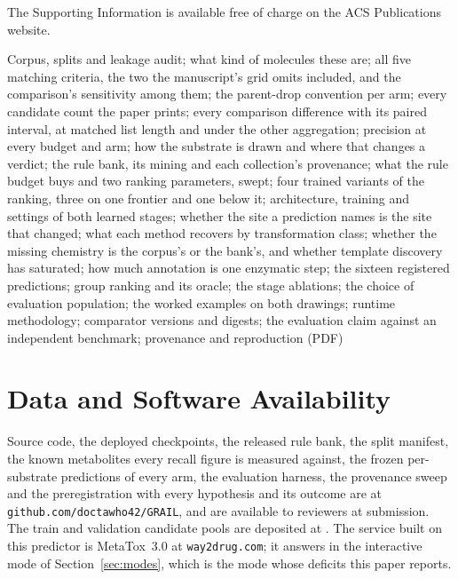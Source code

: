 \begin{suppinfo}

The Supporting Information is available free of charge on the ACS Publications website.

Corpus, splits and leakage audit; what kind of molecules these are; all five matching criteria,
the two the manuscript's grid omits included, and the comparison's sensitivity among them; the parent-drop convention per arm; every candidate count the paper prints; every comparison
difference with its paired interval, at matched list length and under the other aggregation;
precision at every budget and arm; how the substrate is drawn and where that changes a verdict; the rule bank, its
mining and each collection's provenance; what the rule budget buys and two ranking parameters,
swept; four trained variants of the ranking, three on one
frontier and one below it; architecture, training and settings of both learned
stages; whether the site a prediction names is the site that changed; what each method recovers by
transformation class; whether the missing chemistry is the corpus's or the bank's, and whether
template discovery has saturated; how much annotation is one enzymatic step; the sixteen
registered predictions; group ranking and its oracle; the stage ablations; the choice of evaluation
population; the worked examples on both drawings; runtime methodology; comparator versions and
digests; the evaluation claim against an independent benchmark; provenance and reproduction (PDF)

\end{suppinfo}

\section{Data and Software Availability}

Source code, the deployed checkpoints, the released rule bank, the split manifest, the known
metabolites every recall figure is measured against, the frozen per-substrate predictions of every
arm, the evaluation harness, the provenance sweep and the preregistration with every
hypothesis and its outcome are at \texttt{github.com/doctawho42/GRAIL}, and are available to
reviewers at submission. The train and validation candidate pools are deposited at \ZenodoDoi{}.
The service built on this predictor is MetaTox~3.0 at \texttt{way2drug.com}; it answers in the
interactive mode of Section~\ref{sec:modes}, which is the mode whose deficits this paper reports.

